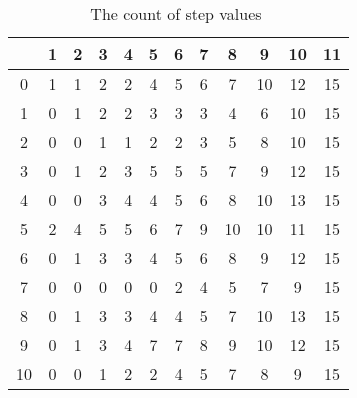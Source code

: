 \documentclass[12pt]{article}
\begin{document}
\begin{example}
    \begin{table}
        \centering
        \begin{tabular}{c|ccccccccccc}
                   & 1 & 2 & 3 & 4 & 5 & 6 & 7  & 8  & 9  & 10 & 11 \\ 
            \hline
            0      & 1 & 1 & 2 & 2 & 4 & 5 & 6 & 7  & 10 & 12 & 15 \\ 
            1      & 0 & 1 & 2 & 2 & 3 & 3 & 3 & 4  & 6  & 10 & 15 \\ 
            2      & 0 & 0 & 1 & 1 & 2 & 2 & 3 & 5  & 8  & 10 & 15 \\ 
            3      & 0 & 1 & 2 & 3 & 5 & 5 & 5 & 7  & 9  & 12 & 15 \\ 
            4      & 0 & 0 & 3 & 4 & 4 & 5 & 6 & 8  & 10 & 13 & 15 \\ 
            5      & 2 & 4 & 5 & 5 & 6 & 7 & 9 & 10 & 10 & 11 & 15 \\ 
            6      & 0 & 1 & 3 & 3 & 4 & 5 & 6 & 8  & 9  & 12 & 15 \\ 
            7      & 0 & 0 & 0 & 0 & 0 & 2 & 4 & 5  & 7  & 9  & 15 \\ 
            8      & 0 & 1 & 3 & 3 & 4 & 4 & 5 & 7  & 10 & 13 & 15 \\ 
            9      & 0 & 1 & 3 & 4 & 7 & 7 & 8 & 9  & 10 & 12 & 15 \\ 
            10     & 0 & 0 & 1 & 2 & 2 & 4 & 5 & 7  & 8  & 9  & 15 \\ 
        \end{tabular}
        \caption{The count of step values \( \)}%
        \label{tab:serialsignificance:rhon}
    \end{table}


\end{example}
\end{document}
